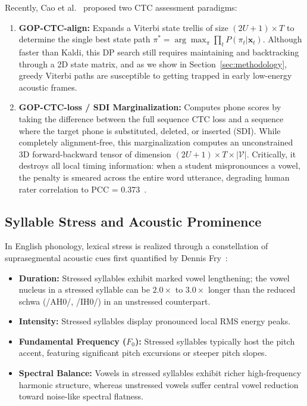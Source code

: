 \documentclass[10pt,conference]{IEEEtran}
\begin{document}
Recently, Cao et al.~\cite{cao2024framework} proposed two CTC assessment paradigms:
\begin{enumerate}
    \item \textbf{GOP-CTC-align:} Expands a Viterbi state trellis of size $(2U+1) \times T$ to determine the single best state path $\pi^* = \arg\max_\pi \prod_t P(\pi_t | \mathbf{x}_t)$. Although faster than Kaldi, this DP search still requires maintaining and backtracking through a 2D state matrix, and as we show in Section~\ref{sec:methodology}, greedy Viterbi paths are susceptible to getting trapped in early low-energy acoustic frames.
    \item \textbf{GOP-CTC-loss / SDI Marginalization:} Computes phone scores by taking the difference between the full sequence CTC loss and a sequence where the target phone is substituted, deleted, or inserted (SDI). While completely alignment-free, this marginalization computes an unconstrained 3D forward-backward tensor of dimension $(2U+1) \times T \times |\mathcal{V}|$. Critically, it destroys all local timing information: when a student mispronounces a vowel, the penalty is smeared across the entire word utterance, degrading human rater correlation to PCC = 0.373~\cite{cao2024framework}.
\end{enumerate}

\subsection{Syllable Stress and Acoustic Prominence}
In English phonology, lexical stress is realized through a constellation of suprasegmental acoustic cues first quantified by Dennis Fry~\cite{fry1958experiments}:
\begin{itemize}
    \item \textbf{Duration:} Stressed syllables exhibit marked vowel lengthening; the vowel nucleus in a stressed syllable can be $2.0\times$ to $3.0\times$ longer than the reduced schwa (/AH0/, /IH0/) in an unstressed counterpart.
    \item \textbf{Intensity:} Stressed syllables display pronounced local RMS energy peaks.
    \item \textbf{Fundamental Frequency ($F_0$):} Stressed syllables typically host the pitch accent, featuring significant pitch excursions or steeper pitch slopes.
    \item \textbf{Spectral Balance:} Vowels in stressed syllables exhibit richer high-frequency harmonic structure, whereas unstressed vowels suffer central vowel reduction toward noise-like spectral flatness.
\end{itemize}
\end{document}
